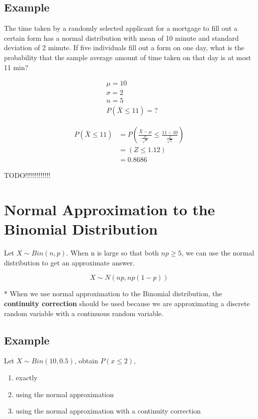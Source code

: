 \documentclass{article}
\begin{document}
    \subsection*{Example}
    The time taken by a randomly selected applicant for a mortgage to fill out a certain form has a normal distribution
    with mean of 10 minute and standard deviation of 2 minute. If five individuals fill out a form on one day, what is the
    probability that the sample average amount of time taken on that day is at most 11 min?

    \begin{align*}
        &\mu = 10\\
        &\sigma = 2\\
        &n = 5\\
        &P(\bar{X} \leq 11) = ?
    \end{align*}

    \begin{align*}
        P(\bar{X} \leq 11) &= P(\frac{\bar{X} - \mu}{ \frac{\sigma}{\sqrt{n}}} \leq \frac{11-10}{\frac{2}{\sqrt{5}}})\\
        &=(Z\leq 1.12)\\
        &= 0.8686
    \end{align*}

    TODO!!!!!!!!!!!!!

    \section*{Normal Approximation to the Binomial Distribution}
    Let $X \sim Bin(n, p)$. When n is large so that both $np\geq 5$, we can use the normal distribution to 
    get an approximate answer.

    \begin{equation*}
        X \sim N(np, np(1-p))
    \end{equation*}

    * When we use normal approximation to the Binomial distribution, the \textbf{continuity correction} 
    should be used because we are approximating a discrete random variable with a continuous random variable.

    \subsection*{Example}
    Let $X \sim Bin(10, 0.5)$, obtain $P(x\leq 2)$,
    \begin{enumerate}
        \item exactly
        \item using the normal approximation
        \item using the normal approximation with a continuity correction
    \end{enumerate}
\end{document}
